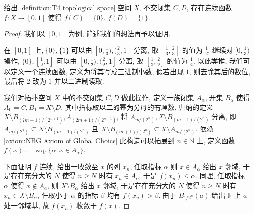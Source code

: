 \begin{theorem}[Urysohn 引理]
    \label {theorem:urysohn's lemma}
    给出 \ref{definition:T4 topological space} 空间 \(X\), 不交闭集 \(C,D\), 存在连续函数 \(f : X \to [0,1]\) 
    使得 \(f(C) = \{0\}\), \(f(D) = \{1\}\).

    \begin{proof}
        我们以 \([0,1]\) 为例, 简述我们的想法再予以证明.

        在 \([0,1]\) 上, \(\{0\},\{1\}\) 可以由 \([0,\frac{1}{3}), (\frac{2}{3},1]\) 分离, 取 \([\frac{1}{3},\frac{2}{3}]\) 的值为 \(\frac{1}{2}\),
        继续对 \([0,\frac{1}{3})\) 操作, \(\{0\}, [\frac{1}{3}, 1]\) 可以由 \([0,\frac{1}{9}), (\frac{2}{9},1]\) 分离,
        取 \([\frac{1}{9},\frac{2}{9}]\) 的值为 \(\frac{1}{4}\), 以此类推, 我们可以定义一个连续函数, 定义为将其写成三进制小数, 假若出现 \(1\), 则去除其后的数位,
        最后将 \(2\) 改为 \(1\) 并以二进制读取.

        我们对拓扑空间 \(X\) 中的不交闭集 \(C,D\) 做此操作, 定义一族闭集 \(A_\alpha\), 开集 \(B_\alpha\) 使得 \(A_0 = C, B_1 = X \setminus D\),
        其中指标取以二的幂为分母的有理数. 归纳的定义 \(X \setminus B_{(2m + 1)/(2^{n+1})}, A_{(2m + 1)/(2^{n+1})}\), 将 \(A_{m/(2^n)}, X \setminus B_{(m+1)/(2^n)}\) 分离,
        即 \(A_{m/(2^n)} \subseteq X \setminus B_{(m+1)/(2^n)}\) 且 \(X \setminus B_{(m+1)/(2^n)} \subseteq X \setminus A_{m/(2^n)}\).
        依赖 \ref{axiom:NBG Axiom of Global Choice} 此构造可以拓展到 \(n \in \mathbb{N}\) 上, 定义函数 \(f(x) := \sup \{\alpha : x \in A_\alpha\}\).

        下面证明 \(f\) 连续, 给出一收敛至 \(x\) 的列 \(x_n\), 任取指标 \(\alpha\) 则 \(x \in A_\alpha\) 给出 \(x\) 邻域,
        于是存在充分大的 \(N\) 使得 \(n \ge N\) 时有 \(x_n \in A_\alpha\), 于是 \(f(x_n) \le \alpha\). 同理, 任取指标 \(\alpha\)
        使得 \(x \notin A_\alpha\), 则 \(X \setminus B_\alpha\) 给出 \(x\) 邻域, 于是存在充分大的 \(N\) 使得 \(n \ge N\) 时有 \(x_n \in X \setminus B_\alpha\),
        任取小于 \(\alpha\) 的指标 \(\beta\) 均有 \(f(x_n) > \beta\). 由于 \(B_{1/2^n} (a)\) 给出 \(\mathbb{R}\) 上 \(a\) 处一邻域基, 故 \(f(x_n)\) 收敛于 \(f(x)\).
    \end{proof}
\end{theorem}

